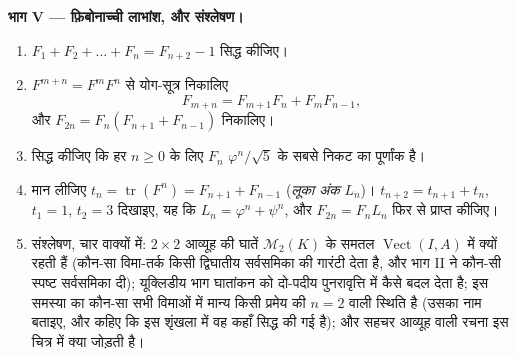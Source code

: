 \begin{problem}
\medskip \noindent\textbf{भाग V --- फ़िबोनाच्ची लाभांश, और संश्लेषण।}
\begin{enumerate}[resume]
  \item $F_1 + F_2 + \dots + F_n = F_{n+2} - 1$ सिद्ध कीजिए।
  \item $F^{m+n} = F^m F^n$ से योग-सूत्र निकालिए
        \[
        F_{m+n} = F_{m+1}F_n + F_m F_{n-1},
        \]
        और $F_{2n} = F_n(F_{n+1} + F_{n-1})$ निकालिए।
  \item सिद्ध कीजिए कि हर $n \geq 0$ के लिए $F_n$ $\varphi^n/\sqrt5$ के सबसे
  निकट का पूर्णांक है।
  \item मान लीजिए $t_n = \operatorname{tr}(F^n) = F_{n+1} + F_{n-1}$
  (\emph{लूका अंक} $L_n$)। $t_{n+2} = t_{n+1} + t_n$, $t_1 = 1$, $t_2 = 3$
  दिखाइए, यह कि $L_n = \varphi^n + \psi^n$, और $F_{2n} = F_n L_n$ फिर से
  प्राप्त कीजिए।
  \item संश्लेषण, चार वाक्यों में: $2 \times 2$ आव्यूह की घातें
  $\mathcal{M}_2(K)$ के समतल $\operatorname{Vect}(I, A)$ में क्यों रहती हैं
  (कौन-सा विमा-तर्क किसी द्विघातीय सर्वसमिका की गारंटी देता है, और भाग II ने
  कौन-सी स्पष्ट सर्वसमिका दी); यूक्लिडीय भाग घातांकन को दो-पदीय पुनरावृत्ति
  में कैसे बदल देता है; इस समस्या का कौन-सा  सभी विमाओं में मान्य किसी
  प्रमेय की $n = 2$ वाली स्थिति है (उसका नाम बताइए, और कहिए कि इस शृंखला में
  वह कहाँ सिद्ध की गई है); और सहचर आव्यूह वाली रचना इस चित्र में क्या जोड़ती
  है।
\end{enumerate}
\end{problem}
